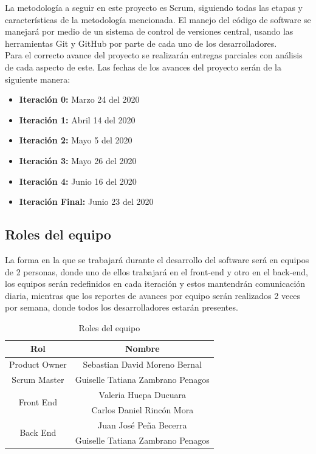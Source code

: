 \documentclass[a4paper,12 pt]{article}
\begin{document}
La metodología a seguir en este proyecto es Scrum, siguiendo todas las etapas y
características de la metodología mencionada. El manejo del código de software se
manejará por medio de un sistema de control de versiones central, usando las
herramientas Git y GitHub por parte de cada uno de los desarrolladores. \\

Para el correcto avance del proyecto se realizarán entregas parciales con análisis de
cada aspecto de este. Las fechas de los avances del proyecto serán de la siguiente
manera:

\begin{itemize}
    \item \textbf{Iteración 0:} Marzo 24 del 2020
    \item \textbf{Iteración 1:} Abril 14 del 2020
    \item \textbf{Iteración 2:} Mayo 5 del 2020
    \item \textbf{Iteración 3:} Mayo 26 del 2020
    \item \textbf{Iteración 4:} Junio 16 del 2020
    \item \textbf{Iteración Final:} Junio 23 del 2020
\end{itemize}{}

\subsection{Roles del equipo}

La forma en la que se trabajará durante el desarrollo del software será en equipos de 2
personas, donde uno de ellos trabajará en el front-end y otro en el back-end, los
equipos serán redefinidos en cada iteración y estos mantendrán comunicación diaria,
mientras que los reportes de avances por equipo serán realizados 2 veces por semana,
donde todos los desarrolladores estarán presentes.

\begin{table}[H]
    \centering
    \small{
    \begin{tabular}{|c|c|}
        \hline
        \textbf{Rol}   &   \textbf{Nombre}  \\ 
        \hline
        Product Owner   &   Sebastian David Moreno Bernal\\
        \hline
        Scrum Master   &   Guiselle Tatiana Zambrano Penagos\\
        \hline
        \multirow{2}{2cm}{Front End}    &   Valeria Huepa Ducuara\\
            &   Carlos Daniel Rincón Mora\\
        \hline
        \multirow{2}{2cm}{Back End}    &   Juan José Peña Becerra\\
            &   Guiselle Tatiana Zambrano Penagos\\
        \hline
         
    \end{tabular}
    \caption{Roles del equipo}}
    \label{T00}
\end{table}{}
\end{document}
